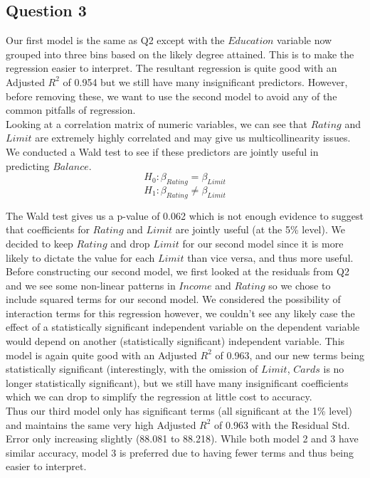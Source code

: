 \documentclass[11pt]{article}
\begin{document}
{\subsection*{Question 3}
Our first model is the same as Q2 except with the $Education$ variable now grouped into three bins based on the likely degree attained. This is to make the regression easier to interpret. The resultant regression is quite good with an Adjusted $R^2$ of 0.954 but we still have many insignificant predictors. However, before removing these, we want to use the second model to avoid any of the common pitfalls of regression.\\

Looking at a correlation matrix of numeric variables, we can see that $Rating$ and $Limit$ are extremely highly correlated and may give us multicollinearity issues. We conducted a Wald test to see if these predictors are jointly useful in predicting $Balance$. 
$$H_0: \beta_{Rating} = \beta_{Limit}$$
$$H_1: \beta_{Rating} \neq \beta_{Limit}$$

The Wald test gives us a p-value of 0.062 which is not enough evidence to suggest that coefficients for $Rating$ and $Limit$ are jointly useful (at the 5\% level). We decided to keep $Rating$ and drop $Limit$ for our second model since it is more likely to dictate the value for each $Limit$ than vice versa, and thus more useful.\\

Before constructing our second model, we first looked at the residuals from Q2 and we see some non-linear patterns in $Income$ and $Rating$ so we chose to include squared terms for our second model. We considered the possibility of interaction terms for this regression however, we couldn't see any likely case the effect of a statistically significant independent variable on the dependent variable would depend on another (statistically significant) independent variable. This model is again quite good with an Adjusted $R^2$ of 0.963, and our new terms being statistically significant (interestingly, with the omission of $Limit$, $Cards$ is no longer statistically significant), but we still have many insignificant coefficients which we can drop to simplify the regression at little cost to accuracy.\\

Thus our third model only has significant terms (all significant at the 1\% level) and maintains the same very high Adjusted $R^2$ of 0.963 with the Residual Std. Error only increasing slightly (88.081 to 88.218). While both model 2 and 3 have similar accuracy, model 3 is preferred due to having fewer terms and thus being easier to interpret.\\

}
\end{document}
